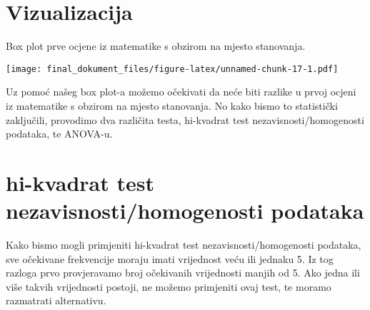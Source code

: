 \documentclass[
]{article}
\newenvironment{Shaded}{\begin{snugshade}}{\end{snugshade}}
\newcommand{\FunctionTok}[1]{\textcolor[rgb]{0.00,0.00,0.00}{#1}}
\newcommand{\NormalTok}[1]{#1}
\newcommand{\OtherTok}[1]{\textcolor[rgb]{0.56,0.35,0.01}{#1}}
\newcommand{\SpecialCharTok}[1]{\textcolor[rgb]{0.00,0.00,0.00}{#1}}
\begin{document}
\hypertarget{vizualizacija}{%
\section{Vizualizacija}\label{vizualizacija}}

Box plot prve ocjene iz matematike s obzirom na mjesto stanovanja.

\begin{Shaded}
\end{Shaded}

\texttt{[image: final\_dokument\_files/figure-latex/unnamed-chunk-17-1.pdf]}

Uz pomoć našeg box plot-a možemo očekivati da neće biti razlike u prvoj
ocjeni iz matematike s obzirom na mjesto stanovanja. No kako bismo to
statistički zaključili, provodimo dva različita testa, hi-kvadrat test
nezavisnosti/homogenosti podataka, te ANOVA-u.

\hypertarget{hi-kvadrat-test-nezavisnostihomogenosti-podataka}{%
\section{hi-kvadrat test nezavisnosti/homogenosti
podataka}\label{hi-kvadrat-test-nezavisnostihomogenosti-podataka}}

Kako bismo mogli primjeniti hi-kvadrat test nezavisnosti/homogenosti
podataka, sve očekivane frekvencije moraju imati vrijednost veću ili
jednaku 5. Iz tog razloga prvo provjeravamo broj očekivanih vrijednosti
manjih od 5. Ako jedna ili više takvih vrijednosti postoji, ne možemo
primjeniti ovaj test, te moramo razmatrati alternativu.
\end{document}
